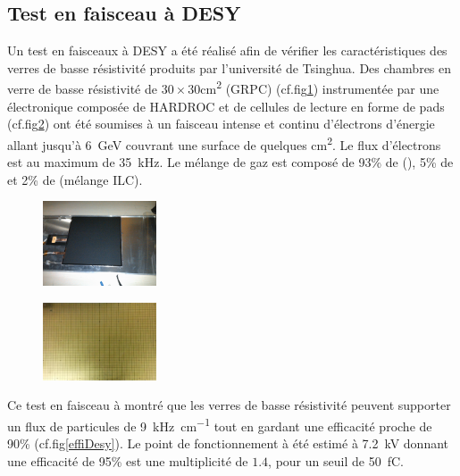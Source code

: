 \subsection{Test en faisceau à DESY}
Un test en faisceaux à DESY \cite{Haddad:2012fx} a été réalisé afin de vérifier les caractéristiques des verres de basse résistivité produits par l'université de Tsinghua. Des chambres en verre de basse résistivité de $30\times30$\si{\square\centi\meter} (GRPC) (cf.fig\ref{chambre}) instrumentée par une électronique composée de HARDROC et de cellules de lecture en forme de pads (cf.fig\ref{cellule}) ont été soumises à un faisceau intense et continu d'électrons d'énergie allant jusqu'à \SI{6}{\giga\eV} couvrant une surface de quelques \si{\square\centi\meter}. Le flux d'électrons est au maximum de \SI{35}{\kilo\hertz}. Le mélange de gaz est composé de 93\% de (), 5\% de  et 2\% de  (mélange ILC).
\begin{figure}[ht!]
	\centering
	\includegraphics[width=0.3\textwidth]{GLA/chambre.png}
	\label{chambre}
\end{figure}
\begin{figure}[ht!]
	\centering
	\includegraphics[width=0.3\textwidth]{GLA/cellules.jpg}
	\label{cellule}
\end{figure}

Ce test en faisceau à montré que les verres de basse résistivité peuvent supporter un flux de particules de \SI{9}{\kilo\hertz\per\centi\meter} tout en gardant une efficacité proche de 90\% (cf.fig\ref{effiDesy}). Le point de fonctionnement à été estimé à \SI{7.2}{\kilo\volt} donnant une efficacité de 95\% est une multiplicité de $1.4$, pour un seuil de \SI{50}{\femto\coulomb}. 

